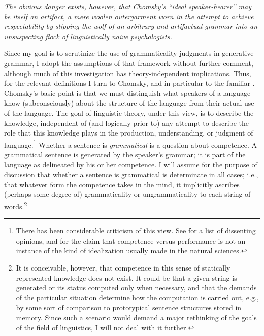 \epigraph{\textit{The obvious danger exists, however, that Chomsky's ``ideal speaker-hearer'' may be itself an artifact, a mere woolen outergarment worn in the attempt to achieve respectability by slipping  the wolf of an arbitrary and artifactual grammar into an unsuspecting flock  of linguistically naive psychologists.\\[-2\baselineskip]}}{\citep{Derwing1979}}

\noindent Since my goal is to scrutinize the use of grammaticality judgments in generative grammar, I adopt the assumptions of that framework without further comment, although much of this investigation has theory-independent implications. Thus, for the relevant definitions I turn to Chomsky, and in particular to the familiar . Chomsky's basic point is that we must distinguish what speakers of a language know (subconsciously) about the structure of the language from their actual use of the language. The goal of linguistic theory, under this view, is to describe the knowledge, independent of (and logically prior to) any attempt to describe the role that this knowledge plays in the production, understanding, or judgment of language.\footnote{There has been considerable criticism of this view. See \citet{Greenbaum1976b} for a list of dissenting opinions, and \citet{Derwing1973} for the claim that competence versus performance is not an instance of the kind of idealization usually made in the natural sciences.
}
 Whether a sentence is \textit{grammatical} is a question about competence. A grammatical sentence is generated by the speaker's grammar; it is part of the language as delineated by his or her competence. I will assume for the purpose of discussion that whether a sentence is grammatical is determinate in all cases; i.e., that whatever form the competence takes in the mind, it implicitly ascribes (perhaps some degree of) grammaticality or ungrammaticality to each string of words.\footnote{It is conceivable, however, that competence in this sense of statically represented knowledge does not exist. It could be that a given string is generated or its status computed only when necessary, and that the demands of the particular situation determine how the computation is carried out, e.g., by some sort of comparison to prototypical sentence structures stored in memory. Since such a scenario would demand a major rethinking of the goals of the field of linguistics, I will not deal with it further.}
